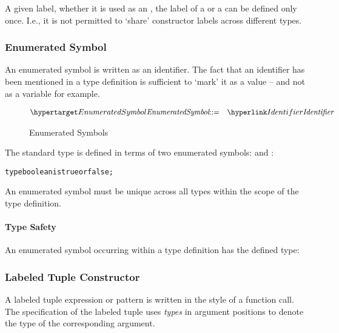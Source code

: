 \begin{aside}
A given label, whether it is used as an , the label of a  or a  can be defined only once. I.e., it is not permitted to `share' constructor labels across different types.
\end{aside}

\subsubsection{Enumerated Symbol}
\label{enumSymbol}
An enumerated symbol is written as an identifier. The fact that an identifier has been mentioned in a type definition is sufficient to `mark' it as a value -- and not as a variable for example.
\begin{figure}[htbp]
\begin{eqnarray*}
\ntDef{EnumeratedSymbol}&\arrow&\ntRef{Identifier}
\end{eqnarray*}
\caption{Enumerated Symbols}
\label{enumSymbolFig}
\end{figure}

The standard type  is defined in terms of two enumerated symbols:  and :
\begin{alltt}
type boolean is true or false;
\end{alltt}

\begin{aside}
An enumerated symbol must be unique across all types within the scope of the type definition.
\end{aside}

\paragraph{Type Safety}
An enumerated symbol occurring within a type definition has the defined type:
\begin{prooftree}
\end{prooftree}

\subsubsection{Labeled Tuple Constructor}
\label{conFun}
A labeled tuple expression or pattern is written in the style of a function call. The specification of the labeled tuple uses \emph{types} in argument positions to denote the type of the corresponding argument.


